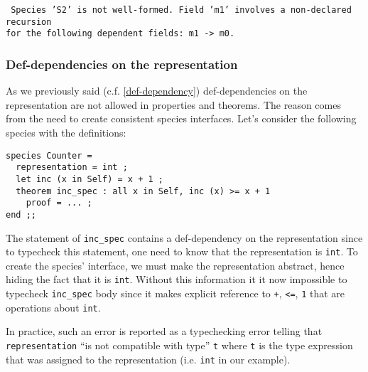 \noindent
{\scriptsize
{\tt
Species 'S2' is not well-formed. Field
'm1' involves a non-declared recursion\\
for the following dependent fields: m1 -> m0.
}
}



\subsubsection{Def-dependencies on the representation}
\label{def-dep-on-representation}
As we previously said (c.f. \ref{def-dependency}) def-dependencies on
the representation are not allowed in properties and theorems. The reason
comes from the need to create consistent species interfaces. Let's
consider the following species with the definitions:
{\scriptsize
\begin{lstlisting}
species Counter =
  representation = int ;
  let inc (x in Self) = x + 1 ;
  theorem inc_spec : all x in Self, inc (x) >= x + 1
    proof = ... ;
end ;;
\end{lstlisting}
}

The statement of {\tt inc\_spec} contains a def-dependency on the
representation since to typecheck this statement, one need to know that the
representation is  {\tt int}. To create the species' interface,
we must make the representation abstract, hence hiding the fact that
it is {\tt int}. Without this information it it now
impossible to typecheck  {\tt inc\_spec}  body since it
makes explicit reference to {\tt +}, {\tt <=}, {\tt 1} that are
operations about {\tt int}.

In practice, such an error is reported as a typechecking error telling
that {\tt representation} ``is not compatible with type'' {\tt t} where {\tt t}
is the type expression that was assigned to the representation (i.e.
{\tt int} in 
our example).
